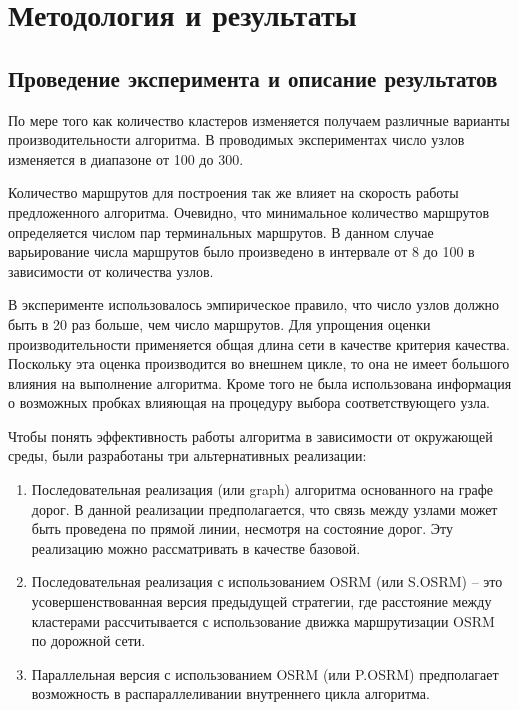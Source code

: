 \chapter{Методология и результаты}
\section{Проведение эксперимента и описание результатов}
По мере того как количество кластеров изменяется получаем различные варианты производительности алгоритма. 
В проводимых экспериментах число узлов изменяется в диапазоне от 100 до 300.

Количество маршрутов для построения так же влияет на скорость работы предложенного алгоритма. Очевидно, что 
минимальное количество маршрутов определяется числом пар терминальных маршрутов. В данном случае варьирование 
числа маршрутов было произведено в интервале от 8 до 100 в зависимости от количества узлов.

В эксперименте использовалось эмпирическое правило, что число узлов должно быть в 20 раз больше, чем число 
маршрутов. Для упрощения оценки производительности применяется общая длина сети в качестве критерия качества.
Поскольку эта оценка производится во внешнем цикле, то она не имеет большого влияния на выполнение алгоритма.
Кроме того не была использована информация о возможных пробках влияющая на процедуру выбора соответствующего 
узла.

Чтобы понять эффективность работы алгоритма в зависимости от окружающей среды, были разработаны три 
альтернативных реализации:
\begin{enumerate}
    \item Последовательная реализация (или graph) алгоритма основанного на графе дорог. В данной реализации 
        предполагается, что связь между узлами может быть проведена по прямой линии, несмотря на состояние 
        дорог. Эту реализацию можно рассматривать в качестве базовой.
    \item Последовательная реализация с использованием OSRM (или S.OSRM) -- это усовершенствованная версия 
        предыдущей стратегии, где расстояние между кластерами рассчитывается с использование движка 
        маршрутизации OSRM по дорожной сети.
    \item Параллельная версия с использованием OSRM (или P.OSRM) предполагает возможность в распараллеливании 
        внутреннего цикла алгоритма.  
\end{enumerate}

\clearpage

